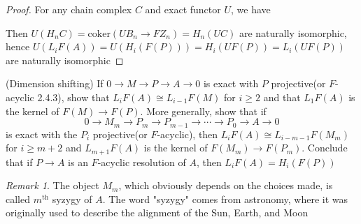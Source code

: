\documentclass{article}
\newenvironment{exercise}[2][Exercise]{\begin{trivlist}
\item[\hskip \labelsep {\bfseries #1}\hskip \labelsep {\bfseries #2.}]}{\end{trivlist}}
\theoremstyle{definition}
\theoremstyle{remark}
\newtheorem*{remark}{Remark}
\theoremstyle{definition}
\begin{document}
\begin{proof}
For any chain complex $C$ and exact functor $U$, we have
\begin{center}
\end{center}
Then $U(H_nC)=\mathrm{coker}(UB_n\to FZ_n)=H_n(UC)$ are naturally isomorphic, hence $U(L_iF(A))=U(H_i(F(P)))=H_i(UF(P))=L_i(UF(P))$ are naturally isomorphic
\end{proof}

\begin{exercise}{\textbf{2.4.3}}(Dimension shifting)
If $0\to M\to P\to A\to0$ is exact with $P$ projective(or $F$-acyclic 2.4.3), show that $L_iF(A)\cong L_{i-1}F(M)$ for $i\geq2$ and that $L_1F(A)$ is the kernel of $F(M)\to F(P)$. More generally, show that if
\[0\to M_m\to P_m\to P_{m-1}\to\cdots\to P_0\to A\to0\]
is exact with the $P_i$ projective(or $F$-acyclic), then $L_iF(A)\cong L_{i-m-1}F(M_m)$ for $i\geq m+2$ and $L_{m+1}F(A)$ is the kernel of $F(M_m)\to F(P_m)$. Conclude that if $P\to A$ is an $F$-acyclic resolution of $A$, then $L_iF(A)=H_i(F(P))$
\end{exercise}

\begin{remark}
The object $M_m$, which obviously depends on the choices made, is called $m^{\mathrm{th}}$ syzygy of $A$. The word "syzygy" comes from astronomy, where it was originally used to describe the alignment of the Sun, Earth, and Moon
\end{remark}
\end{document}
